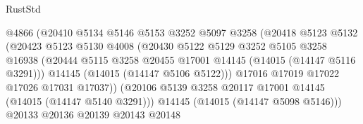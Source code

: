 \begin{lexlean}{RustStd}
\begin{coremodule}
                                      @4866
                                      (@20410
                                        @5134
                                        @5146
                                        @5153
                                        @3252
                                        @5097
                                        @3258
                                        (@20418
                                          @5123
                                          @5132
                                          (@20423
                                            @5123
                                            @5130
                                            @4008
                                            (@20430
                                              @5122
                                              @5129
                                              @3252
                                              @5105
                                              @3258
                                              @16938
                                              (@20444
                                                @5115
                                                @3258
                                                @20455
                                                @17001
                                                @14145
                                                (@14015 (@14147 @5116 @3291)))
                                              @14145
                                              (@14015 (@14147 @5106 @5122)))
                                            @17016
                                            @17019
                                            @17022
                                            @17026
                                            @17031
                                            @17037))
                                        (@20106
                                          @5139
                                          @3258
                                          @20117
                                          @17001
                                          @14145
                                          (@14015 (@14147 @5140 @3291)))
                                        @14145
                                        (@14015 (@14147 @5098 @5146)))
                                      @20133
                                      @20136
                                      @20139
                                      @20143
                                      @20148

\end{coremodule}
\end{lexlean}
